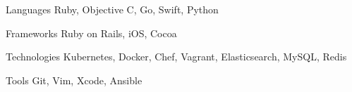 

\begin{cvskills}

  \cvskill
    {Languages} %
    {Ruby, Objective C, Go, Swift, Python} %
    
  \cvskill
    {Frameworks} %
    {Ruby on Rails, iOS, Cocoa} %
    
  \cvskill
    {Technologies} %
    {Kubernetes, Docker, Chef, Vagrant, Elasticsearch, MySQL, Redis} %

  \cvskill
    {Tools} %
    {Git, Vim, Xcode, Ansible} %

\end{cvskills}
